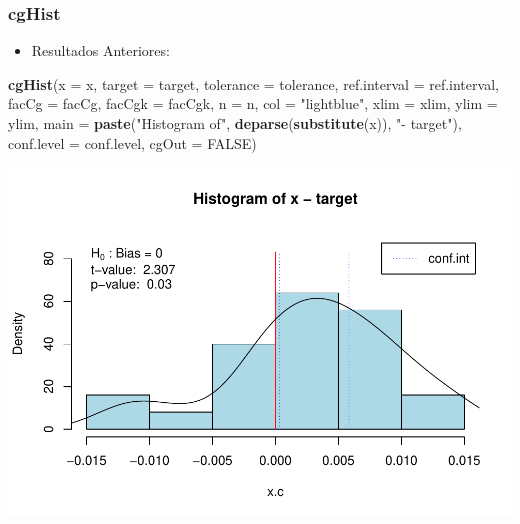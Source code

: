\documentclass[
]{book}
\newenvironment{Shaded}{\begin{snugshade}}{\end{snugshade}}
\newcommand{\AttributeTok}[1]{\textcolor[rgb]{0.13,0.29,0.53}{#1}}
\newcommand{\ConstantTok}[1]{\textcolor[rgb]{0.56,0.35,0.01}{#1}}
\newcommand{\FunctionTok}[1]{\textcolor[rgb]{0.13,0.29,0.53}{\textbf{#1}}}
\newcommand{\NormalTok}[1]{#1}
\newcommand{\OtherTok}[1]{\textcolor[rgb]{0.56,0.35,0.01}{#1}}
\newcommand{\StringTok}[1]{\textcolor[rgb]{0.31,0.60,0.02}{#1}}
\providecommand{\tightlist}{%
  \setlength{\itemsep}{0pt}\setlength{\parskip}{0pt}}
\begin{document}
\hypertarget{cghist}{%
\subsubsection{cgHist}\label{cghist}}

\begin{itemize}
\tightlist
\item
  Resultados Anteriores:
\end{itemize}

\begin{Shaded}
\begin{Highlighting}[]
\FunctionTok{cgHist}\NormalTok{(}\AttributeTok{x =}\NormalTok{ x, }\AttributeTok{target =}\NormalTok{ target, }\AttributeTok{tolerance =}\NormalTok{ tolerance, }\AttributeTok{ref.interval =}\NormalTok{ ref.interval, }
       \AttributeTok{facCg =}\NormalTok{ facCg, }\AttributeTok{facCgk =}\NormalTok{ facCgk, }\AttributeTok{n =}\NormalTok{ n, }\AttributeTok{col =} \StringTok{"lightblue"}\NormalTok{, }
       \AttributeTok{xlim =}\NormalTok{ xlim, }\AttributeTok{ylim =}\NormalTok{ ylim, }\AttributeTok{main =} \FunctionTok{paste}\NormalTok{(}\StringTok{"Histogram of"}\NormalTok{, }
                                              \FunctionTok{deparse}\NormalTok{(}\FunctionTok{substitute}\NormalTok{(x)), }\StringTok{"{-} target"}\NormalTok{), conf.level}
       \OtherTok{=}\NormalTok{ conf.level, }\AttributeTok{cgOut =} \ConstantTok{FALSE}\NormalTok{)}
\end{Highlighting}
\end{Shaded}

\includegraphics{Libro_TidyQualityTools_files/figure-latex/unnamed-chunk-147-1.pdf}
\end{document}
